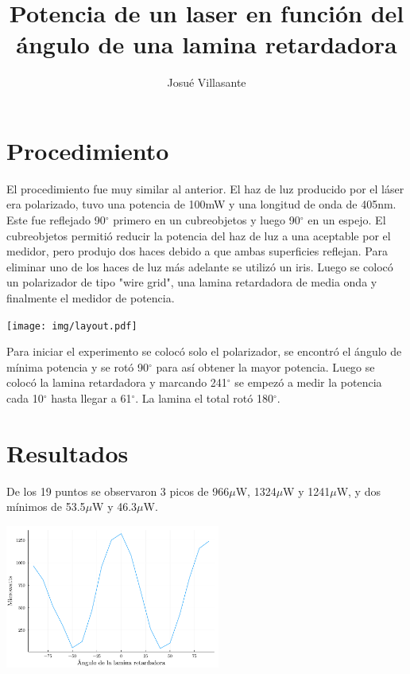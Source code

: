 \documentclass[twocolumn]{article}
\author{Josué Villasante}
\title{Potencia de un laser en función del ángulo de una lamina retardadora}
\begin{document}
	\maketitle

	\section{Procedimiento}
		El procedimiento fue muy similar al anterior. El haz de luz producido por el láser era polarizado, tuvo una potencia de 100mW y una longitud de onda de 405nm. Este fue reflejado 90$^{\circ}$ primero en un cubreobjetos y luego 90$^{\circ}$ en un espejo. El cubreobjetos permitió reducir la potencia del haz de luz a una aceptable por el medidor, pero produjo dos haces debido a que ambas superficies reflejan. Para eliminar uno de los haces de luz más adelante se utilizó un iris. Luego se colocó un polarizador de tipo "wire grid", una lamina retardadora de media onda y finalmente el medidor de potencia.

		\begin{center}
			\texttt{[image: img/layout.pdf]}
		\end{center}

		Para iniciar el experimento se colocó solo el polarizador, se encontró el ángulo de mínima potencia y se rotó 90$^{\circ}$ para así obtener la mayor potencia. Luego se colocó la lamina retardadora y marcando 241$^{\circ}$ se empezó a medir la potencia cada 10$^{\circ}$ hasta llegar a 61$^{\circ}$. La lamina el total rotó 180$^{\circ}$.
	
	\section{Resultados}
		De los 19 puntos se observaron 3 picos de 966$\mu$W, 1324$\mu$W y 1241$\mu$W, y dos mínimos de 53.5$\mu$W y 46.3$\mu$W.

		\begin{center}
			\includegraphics[width=200pt]{img/results.pdf}
		\end{center}
	
\end{document}
